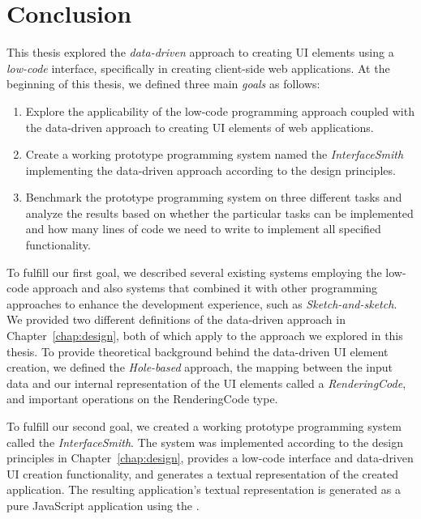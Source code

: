 \chapter*{Conclusion}

This thesis explored the \emph{data-driven} approach to creating UI elements using a \emph{low-code} interface, specifically in creating client-side web applications.
At the beginning of this thesis, we defined three main \emph{goals} as follows:
\begin{enumerate}
	\item Explore the applicability of the low-code programming approach coupled with the data-driven approach to creating UI elements of web applications.
	\item Create a working prototype programming system named the \emph{InterfaceSmith} implementing the data-driven approach according to the design principles.
	\item Benchmark the prototype programming system on three different tasks and analyze the results based on whether the particular tasks can be implemented and how many lines of code we need to write to implement all specified functionality.
\end{enumerate}

\noindent To fulfill our first goal, we described several existing systems employing the low-code approach and also systems that combined it with other programming approaches to enhance the development experience, such as \emph{Sketch-and-sketch}\cite{sketch-and-sketch}.
We provided two different definitions of the data-driven approach in Chapter~\ref{chap:design}, both of which apply to the approach we explored in this thesis.
To provide theoretical background behind the data-driven UI element creation, we defined the \emph{Hole-based} approach, the mapping between the input data and our internal representation of the UI elements called a \emph{RenderingCode},
and important operations on the RenderingCode type.

To fulfill our second goal, we created a working prototype programming system called the \emph{InterfaceSmith}.
The system was implemented according to the design principles in Chapter~\ref{chap:design}, provides a low-code interface and data-driven UI creation functionality, and generates a textual representation of the created application.
The resulting application's textual representation is generated as a pure JavaScript application using the \citet{elm-arch}.

